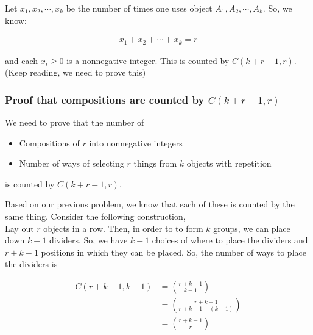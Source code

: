 \documentclass{report}
\begin{document}

\begin{subproof}
    Let $x_1, x_2, \cdots, x_k$ be the number of times one uses object
    $A_1, A_2, \cdots, A_k$. So, we know:

    \begin{align*}
        x_1 + x_2 + \cdots + x_k = r
    \end{align*}

    \noindent
    and each $x_i \ge 0$ is a nonnegative integer.
    This is counted by $C(k+r-1,r)$. (Keep reading, we need to prove this)
\end{subproof}

\subsubsection*{Proof that compositions are counted by $C(k+r-1,r)$}

We need to prove that the number of

\begin{itemize}
    \item Compositions of $r$ into nonnegative integers
    \item Number of ways of selecting $r$ things from $k$ objects with repetition
\end{itemize}

\noindent
is counted by $C(k+r-1,r)$.

\begin{subproof}
    Based on our previous problem, we know that each of these is counted
    by the same thing. Consider the following construction, \\

    Lay out $r$ objects in a row. Then, in order to to form $k$ groups,
    we can place down $k-1$ dividers. So, we have $k-1$ choices of where
    to place the dividers and $r+k-1$ positions in which they can be placed.
    So, the number of ways to place the dividers is

    \begin{align*}
        C(r+k-1,k-1) & = \binom{r+k-1}{k-1}         \\
                     & = \binom{r+k-1}{r+k-1-(k-1)} \\
                     & = \binom{r+k-1}{r}
    \end{align*}
\end{subproof}
\end{document}
